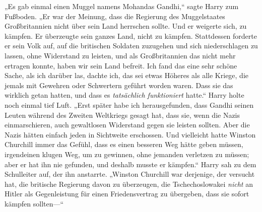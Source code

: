 „Es gab einmal einen Muggel namens Mohandas Gandhi,“ sagte Harry zum Fußboden. „Er war der Meinung, dass die Regierung des Muggelstaates Großbritannien nicht über sein Land herrschen sollte.%
Und er weigerte sich, zu kämpfen. Er überzeugte sein ganzes Land, nicht zu kämpfen. Stattdessen forderte er sein Volk auf, auf die britischen Soldaten zuzugehen und sich niederschlagen zu lassen, ohne Widerstand zu leisten, und als Großbritannien das nicht mehr ertragen konnte, haben wir sein Land befreit. Ich fand das eine sehr schöne Sache, als ich darüber las, dachte ich, das sei etwas Höheres als alle Kriege, die jemals mit Gewehren oder Schwertern geführt worden waren. Dass sie das wirklich getan hatten, und dass es \emph{tatsächlich funktioniert} hatte.“ Harry holte noch einmal tief Luft. „Erst später habe ich herausgefunden, dass Gandhi seinen Leuten während des Zweiten Weltkriegs gesagt hat, dass sie, wenn die Nazis einmarschieren, auch gewaltlosen Widerstand gegen sie leisten sollten. Aber die Nazis hätten einfach jeden in Sichtweite erschossen. Und vielleicht hatte Winston Churchill immer das Gefühl, dass es einen besseren Weg hätte geben müssen, irgendeinen klugen Weg, um zu gewinnen, ohne jemanden verletzen zu müssen; aber er hat ihn nie gefunden, und deshalb musste er kämpfen.“ Harry sah zu dem Schulleiter auf, der ihn anstarrte. „Winston Churchill war derjenige, der versucht hat, die britische Regierung davon zu überzeugen, die Tschechoslowakei \emph{nicht} an Hitler als Gegenleistung für einen Friedensvertrag zu übergeben, dass sie sofort kämpfen sollten—“

